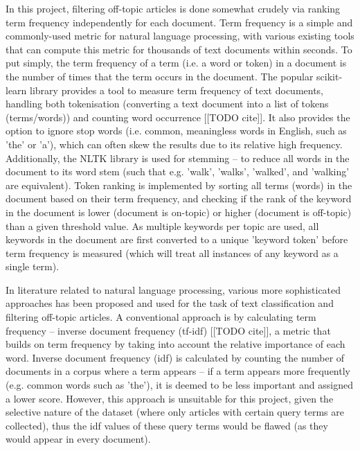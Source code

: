 \documentclass{report}
\begin{document}
In this project, filtering off-topic articles is done somewhat crudely via ranking term frequency independently for each document.
Term frequency is a simple and commonly-used metric for natural language processing, with various existing tools that can compute this metric for thousands of text documents within seconds.
To put simply, the term frequency of a term (i.e. a word or token) in a document is the number of times that the term occurs in the document.
The popular scikit-learn library \cite{Scikit-learn} provides a tool to measure term frequency of text documents, handling both tokenisation (converting a text document into a list of tokens (terms/words)) and counting word occurrence [[TODO cite]].
It also provides the option to ignore stop words (i.e. common, meaningless words in English, such as 'the' or 'a'), which can often skew the results due to its relative high frequency.
Additionally, the NLTK library \cite{Nltk} is used for stemming -- to reduce all words in the document to its word stem (such that e.g. 'walk', 'walks', 'walked', and 'walking' are equivalent).
Token ranking is implemented by sorting all terms (words) in the document based on their term frequency, and checking if the rank of the keyword in the document is lower (document is on-topic) or higher (document is off-topic) than a given threshold value.
As multiple keywords per topic are used, all keywords in the document are first converted to a unique 'keyword token' before term frequency is measured (which will treat all instances of any keyword as a single term).

In literature related to natural language processing, various more sophisticated approaches has been proposed and used for the task of text classification and filtering off-topic articles.
A conventional approach is by calculating term frequency -- inverse document frequency (tf-idf) [[TODO cite]], a metric that builds on term frequency by taking into account the relative importance of each word.
Inverse document frequency (idf) is calculated by counting the number of documents in a corpus where a term appears -- if a term appears more frequently (e.g. common words such as 'the'), it is deemed to be less important and assigned a lower score.
However, this approach is unsuitable for this project, given the selective nature of the dataset (where only articles with certain query terms are collected), thus the idf values of these query terms would be flawed (as they would appear in every document).
\end{document}
